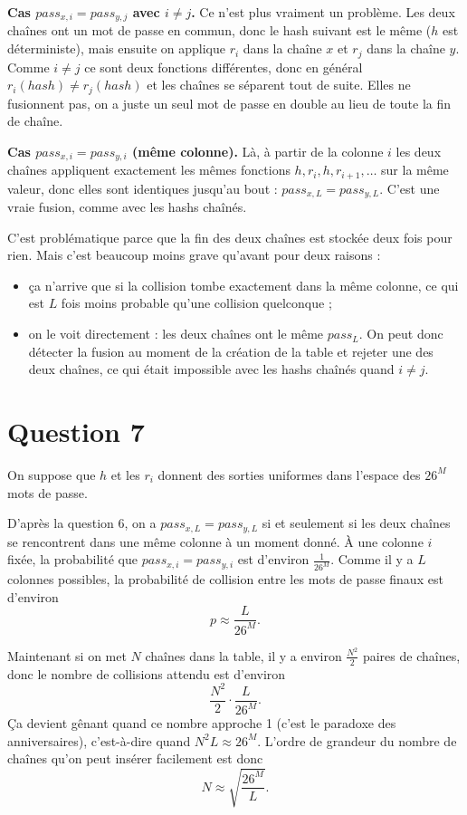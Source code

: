 \documentclass{article}
\begin{document}
\textbf{Cas $pass_{x,i} = pass_{y,j}$ avec $i \neq j$.} Ce n'est plus vraiment un problème. Les deux chaînes ont un mot de passe en commun, donc le hash suivant est le même ($h$ est déterministe), mais ensuite on applique $r_i$ dans la chaîne $x$ et $r_j$ dans la chaîne $y$. Comme $i \neq j$ ce sont deux fonctions différentes, donc en général $r_i(hash) \neq r_j(hash)$ et les chaînes se séparent tout de suite. Elles ne fusionnent pas, on a juste un seul mot de passe en double au lieu de toute la fin de chaîne.

\textbf{Cas $pass_{x,i} = pass_{y,i}$ (même colonne).} Là, à partir de la colonne $i$ les deux chaînes appliquent exactement les mêmes fonctions $h, r_i, h, r_{i+1}, \ldots$ sur la même valeur, donc elles sont identiques jusqu'au bout : $pass_{x,L} = pass_{y,L}$. C'est une vraie fusion, comme avec les hashs chaînés.

C'est problématique parce que la fin des deux chaînes est stockée deux fois pour rien. Mais c'est beaucoup moins grave qu'avant pour deux raisons :
\begin{itemize}
  \item ça n'arrive que si la collision tombe exactement dans la même colonne, ce qui est $L$ fois moins probable qu'une collision quelconque ;
  \item on le voit directement : les deux chaînes ont le même $pass_{L}$. On peut donc détecter la fusion au moment de la création de la table et rejeter une des deux chaînes, ce qui était impossible avec les hashs chaînés quand $i \neq j$.
\end{itemize}

\section*{Question 7}

On suppose que $h$ et les $r_i$ donnent des sorties uniformes dans l'espace des $26^M$ mots de passe.

D'après la question 6, on a $pass_{x,L} = pass_{y,L}$ si et seulement si les deux chaînes se rencontrent dans une même colonne à un moment donné. À une colonne $i$ fixée, la probabilité que $pass_{x,i} = pass_{y,i}$ est d'environ $\frac{1}{26^M}$. Comme il y a $L$ colonnes possibles, la probabilité de collision entre les mots de passe finaux est d'environ
\[
p \approx \frac{L}{26^M}.
\]

Maintenant si on met $N$ chaînes dans la table, il y a environ $\frac{N^2}{2}$ paires de chaînes, donc le nombre de collisions attendu est d'environ
\[
\frac{N^2}{2} \cdot \frac{L}{26^M}.
\]
Ça devient gênant quand ce nombre approche 1 (c'est le paradoxe des anniversaires), c'est-à-dire quand $N^2 L \approx 26^M$. L'ordre de grandeur du nombre de chaînes qu'on peut insérer facilement est donc
\[
N \approx \sqrt{\frac{26^M}{L}}.
\]
\end{document}
